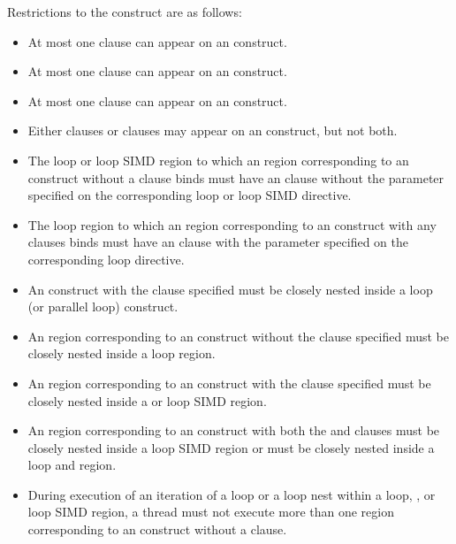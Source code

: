 

\restrictions
Restrictions to the  construct are as follows:

\begin{itemize}
\item At most one  clause can appear on an  construct.

\item At most one  clause can appear on an  construct.

\item At most one  clause can appear on an  construct.

\item Either {} clauses or 
clauses may appear on an  construct, but not both.

\item The loop or loop SIMD region to which an 
region corresponding to an  construct without a 
clause binds must have an  clause without the parameter
specified on the corresponding loop or loop SIMD directive.

\item The loop region to which an  region corresponding to an
 construct with any 
clauses binds must have an  clause with the parameter specified
on the corresponding loop directive.

\item An  construct with the  clause specified must
be closely nested inside a loop (or parallel loop) construct.

\item An  region corresponding to an  construct
without the  clause specified must be closely nested inside a
loop region.

\item An  region corresponding to an  construct with
the  clause specified must be closely nested inside a
 or loop SIMD region.

\item An  region corresponding to an  construct with
  both the  and  clauses must be closely nested inside
  a loop SIMD region or must be closely nested inside a loop and 
  region.

\item During execution of an iteration of a loop or a loop nest within a loop, , or loop SIMD
region, a thread must not execute more than one  region
corresponding to an  construct without a  clause.
\end{itemize}
